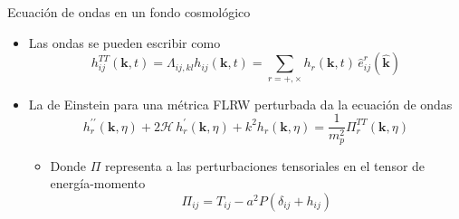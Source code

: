 \documentclass{beamer}
\begin{document}
            \begin{frame}{Ecuación de ondas en un fondo cosmológico}
                \begin{itemize}
                    \item[\textcolor{brown}{$\bullet$}] Las ondas se pueden escribir como
                        \begin{equation*}
                            h_{ij}^{TT} (\textbf{k}, t) = \Lambda_{ij,kl} h_{ij} \left( \textbf{k}, t \right) = \sum_{r = +, \times} h_r (\textbf{k}, t) \, \hat{e}_{ij}^r \left( \hat{\textbf{k}} \right)
                        \end{equation*}
                    \item[\textcolor{brown}{$\bullet$}] La de Einstein para una métrica FLRW perturbada da la ecuación de ondas
                        \begin{equation*}
                            h_{r}^{\prime \prime} (\textbf{k}, \eta) + 2 \mathcal{H} \, h_{r}^\prime (\textbf{k}, \eta) + k^2 h_{r} (\textbf{k}, \eta) = \frac{1}{m_p^2} \Pi_{r}^{TT} (\textbf{k}, \eta)
                        \end{equation*}
                    \begin{itemize}
                        \item[\textcolor{cyan}{$\Longrightarrow$}] Donde $\Pi$ representa a las perturbaciones tensoriales en el tensor de energía-momento
                            \begin{equation*}
                                \Pi_{ij} = T_{ij} - a^2 P \left( \delta_{ij} + h_{ij} \right)
                            \end{equation*}
                    \end{itemize}
                \end{itemize}
            \end{frame}
\end{document}
